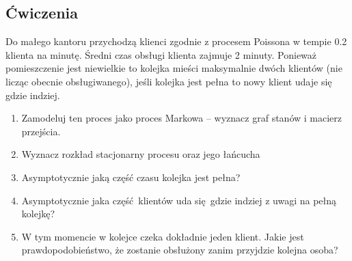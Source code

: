 \subsection{Ćwiczenia}
\begin{exercise}
    Do małego kantoru przychodzą klienci zgodnie z procesem Poissona w tempie 0.2 klienta na minutę.
    Średni czas obsługi klienta zajmuje 2 minuty.
    Ponieważ pomieszczenie jest niewielkie to kolejka mieści maksymalnie dwóch klientów (nie licząc obecnie obsługiwanego), jeśli kolejka jest pełna to 
    nowy klient udaje się gdzie indziej.
    
    \begin{enumerate}
        \item Zamodeluj ten proces jako proces Markowa -- wyznacz graf stanów i macierz przejścia.
        \item Wyznacz rozkład stacjonarny procesu oraz jego łańcucha
        \item Asymptotycznie jaką część czasu kolejka jest pełna?
        \item Asymptotycznie jaka część klientów uda się gdzie indziej z uwagi na pełną kolejkę?
        \item W tym momencie w kolejce czeka dokładnie jeden klient. Jakie jest prawdopodobieństwo, że zostanie obsłużony zanim przyjdzie kolejna osoba?
    \end{enumerate}
\end{exercise}
